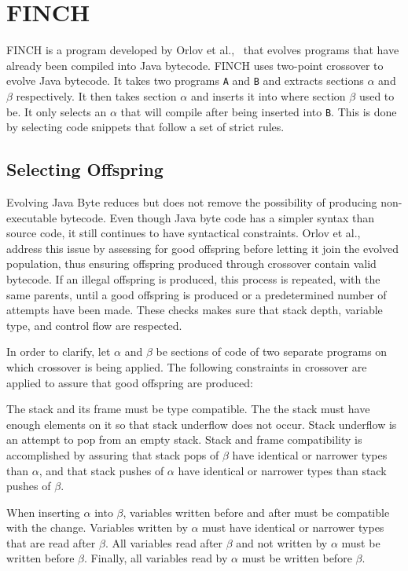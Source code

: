 \documentclass{sig-alternate}
\begin{document}
\section{FINCH}
FINCH is a program developed by Orlov et al.,~\cite{FINCH2:2009,FINCH:2011} that evolves programs that have already been compiled into Java bytecode. FINCH uses two-point crossover to evolve Java bytecode. It takes two programs \texttt{A} and \texttt{B} and extracts sections $\alpha$ and $\beta$ respectively. It then takes section $\alpha$ and inserts it into where section $\beta$ used to be. It only selects an $\alpha$ that will compile after being inserted into \texttt{B}. This is done by selecting code snippets that follow a set of strict rules. 

\subsection{Selecting Offspring}
Evolving Java Byte reduces but does not remove the possibility of producing non-executable bytecode. Even though Java byte code has a simpler syntax than source code, it still continues to have syntactical constraints. Orlov et al.,~\cite{FINCH2:2009} address this issue by assessing for good offspring before letting it join the evolved population, thus ensuring offspring produced through crossover contain valid bytecode. If an illegal offspring is produced, this process is repeated, with the same parents, until a good offspring is produced or a predetermined number of attempts have been made. These checks makes sure that stack depth, variable type, and control flow are respected.\par

In order to clarify, let $\alpha$ and $\beta$ be sections of code of two separate programs on which crossover is being applied.
The following constraints in crossover are applied to assure that good offspring are produced:\par

The stack and its frame must be type compatible. The the stack must have enough elements on it so that stack underflow does not occur. Stack underflow is an attempt to pop from an empty stack. Stack and frame compatibility is accomplished by assuring that stack pops of $\beta$ have identical or narrower types than $\alpha$, and that stack pushes of $\alpha$ have identical or narrower types than stack pushes of $\beta$. \par

When inserting $\alpha$ into $\beta$, variables written before and after must be compatible with the change. Variables written by $\alpha$ must have identical or narrower types that are read after $\beta$. All variables read after $\beta$ and not written by $\alpha$ must be written before $\beta$. Finally, all variables read by $\alpha$ must be written before $\beta$.\par
\end{document}
